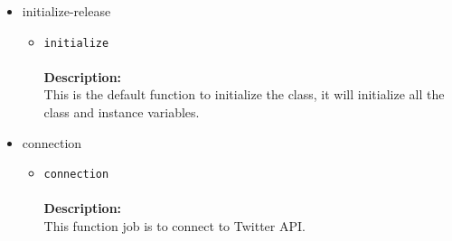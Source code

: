 \begin{itemize}
\begin{itemize}
\begin{itemize}
\item initialize-release
\label{sec-1-4-1-3-3-2}%
\begin{itemize}
\item \verb~initialize~\\\\
\textbf{Description:}\\
      This is the default function to initialize the class, it will initialize all the class and instance variables.
\end{itemize}


\item connection
\label{sec-1-4-1-3-3-3}%
\begin{itemize}
\item \verb~connection~\\\\
\textbf{Description:}\\
      This function job is to connect to Twitter API.\\
\end{itemize}



\end{itemize}
\end{itemize}
\end{itemize}
